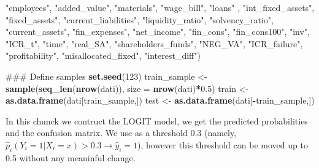 \documentclass[]{article}
\newenvironment{Shaded}{\begin{snugshade}}{\end{snugshade}}
\newcommand{\CommentTok}[1]{\textcolor[rgb]{0.56,0.35,0.01}{\textit{#1}}}
\newcommand{\DataTypeTok}[1]{\textcolor[rgb]{0.13,0.29,0.53}{#1}}
\newcommand{\DecValTok}[1]{\textcolor[rgb]{0.00,0.00,0.81}{#1}}
\newcommand{\FloatTok}[1]{\textcolor[rgb]{0.00,0.00,0.81}{#1}}
\newcommand{\KeywordTok}[1]{\textcolor[rgb]{0.13,0.29,0.53}{\textbf{#1}}}
\newcommand{\NormalTok}[1]{#1}
\newcommand{\OperatorTok}[1]{\textcolor[rgb]{0.81,0.36,0.00}{\textbf{#1}}}
\newcommand{\StringTok}[1]{\textcolor[rgb]{0.31,0.60,0.02}{#1}}
\begin{document}
\begin{Shaded}
\begin{Highlighting}[]
                \StringTok{"employees"}\NormalTok{, }\StringTok{"added_value"}\NormalTok{, }\StringTok{"materials"}\NormalTok{, }\StringTok{"wage_bill"}\NormalTok{, }\StringTok{"loans"}\NormalTok{ ,}
                \StringTok{"int_fixed_assets"}\NormalTok{,  }\StringTok{"fixed_assets"}\NormalTok{, }\StringTok{"current_liabilities"}\NormalTok{,}
                \StringTok{"liquidity_ratio"}\NormalTok{,  }\StringTok{"solvency_ratio"}\NormalTok{, }\StringTok{"current_assets"}\NormalTok{,}
                 \StringTok{"fin_expenses"}\NormalTok{, }\StringTok{"net_income"}\NormalTok{, }\StringTok{"fin_cons"}\NormalTok{, }\StringTok{"fin_cons100"}\NormalTok{, }\StringTok{"inv"}\NormalTok{,}
                \StringTok{"ICR_t"}\NormalTok{, }\StringTok{"time"}\NormalTok{, }\StringTok{"real_SA"}\NormalTok{, }\StringTok{"shareholders_funds"}\NormalTok{, }\StringTok{"NEG_VA"}\NormalTok{,}
                \StringTok{"ICR_failure"}\NormalTok{, }\StringTok{"profitability"}\NormalTok{, }\StringTok{"misallocated_fixed"}\NormalTok{, }
                \StringTok{"interest_diff"}\NormalTok{)}

\NormalTok{### Define samples}
\KeywordTok{set.seed}\NormalTok{(}\DecValTok{123}\NormalTok{)}
\NormalTok{train_sample <-}\StringTok{ }\KeywordTok{sample}\NormalTok{(}\KeywordTok{seq_len}\NormalTok{(}\KeywordTok{nrow}\NormalTok{(dati)), }\DataTypeTok{size =} \KeywordTok{nrow}\NormalTok{(dati)}\OperatorTok{*}\FloatTok{0.5}\NormalTok{) }
\NormalTok{train <-}\StringTok{ }\KeywordTok{as.data.frame}\NormalTok{(dati[train_sample,])}
\NormalTok{test <-}\StringTok{ }\KeywordTok{as.data.frame}\NormalTok{(dati[}\OperatorTok{-}\NormalTok{train_sample,])}
\end{Highlighting}
\end{Shaded}

In this chunck we contruct the LOGIT model, we get the predicted
probabilities and the confusion matrix. We use as a threshold 0.3
(namely, \(\hat{p}_i(Y_i = 1 | X_i = x)>0.3 \rightarrow \hat{y}_i=1\)),
however this threshold can be moved up to 0.5 without any meaninful
change.

\begin{Shaded}
\end{Shaded}
\end{document}
